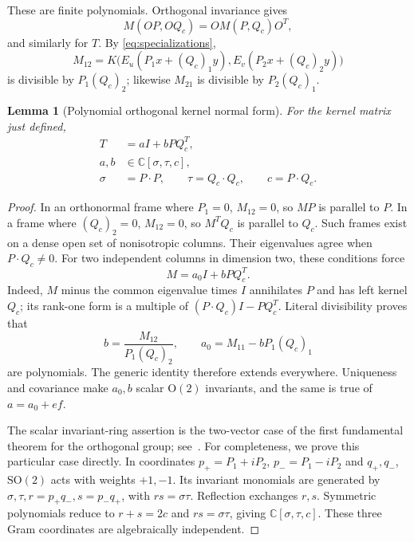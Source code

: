 \documentclass[11pt]{article}
\newtheorem{lemma}[theorem]{Lemma}
\theoremstyle{definition}
\theoremstyle{plain}
\numberwithin{equation}{section}
\begin{document}
These are finite polynomials. Orthogonal invariance gives
\[
 M(OP,OQ_c)=O M(P,Q_c)O^T,
\]
and similarly for \(T\). By \eqref{eq:specializations},
\[
 M_{12}=K\bigl(E_u(P_1x+(Q_c)_1y),E_v(P_2x+(Q_c)_2y)\bigr)
\]
is divisible by \(P_1(Q_c)_2\); likewise \(M_{21}\) is divisible by
\(P_2(Q_c)_1\).

\begin{lemma}[Polynomial orthogonal kernel normal form]\label{lem:matrix}
For the kernel matrix just defined,
\begin{equation}
 \begin{aligned}
 T&=aI+bPQ_c^T,\\
 a,b&\in\mathbb C[\sigma,\tau,c],\\
 \sigma&=P\cdot P,\qquad \tau=Q_c\cdot Q_c,\qquad c=P\cdot Q_c.
 \end{aligned}
 \tag{9}\label{eq:normalform}
\end{equation}
\end{lemma}

\begin{proof}
In an orthonormal frame where \(P_1=0\), \(M_{12}=0\), so \(MP\) is parallel
to \(P\). In a frame where \((Q_c)_2=0\), \(M_{12}=0\), so \(M^TQ_c\) is
parallel to \(Q_c\). Such frames exist on a dense open set of nonisotropic
columns. Their eigenvalues agree when \(P\cdot Q_c\ne0\). For two independent
columns in dimension two, these conditions force
\[
 M=a_0I+bPQ_c^T.
\]
Indeed, \(M\) minus the common eigenvalue times \(I\) annihilates \(P\) and
has left kernel \(Q_c\); its rank-one form is a multiple of
\((P\cdot Q_c)I-PQ_c^T\). Literal divisibility proves that
\[
 b=\frac{M_{12}}{P_1(Q_c)_2},\qquad a_0=M_{11}-bP_1(Q_c)_1
\]
are polynomials. The generic identity therefore extends everywhere.
Uniqueness and covariance make \(a_0,b\) scalar \(\mathrm O(2)\) invariants,
and the same is true of \(a=a_0+ef\).

The scalar invariant-ring assertion is the two-vector case of the first
fundamental theorem for the orthogonal group; see~\cite[Section~10.2(a)]{kraft}.
For completeness, we prove this particular case directly. In coordinates
\(p_+=P_1+iP_2\), \(p_-=P_1-iP_2\) and \(q_+,q_-\),
\(\mathrm{SO}(2)\) acts with weights \(+1,-1\). Its invariant monomials
are generated by \(\sigma,\tau,r=p_+q_-,s=p_-q_+\), with
\(rs=\sigma\tau\). Reflection exchanges \(r,s\). Symmetric polynomials
reduce to \(r+s=2c\) and \(rs=\sigma\tau\), giving
\(\mathbb C[\sigma,\tau,c]\). These three Gram coordinates are algebraically
independent.
\end{proof}
\end{document}
